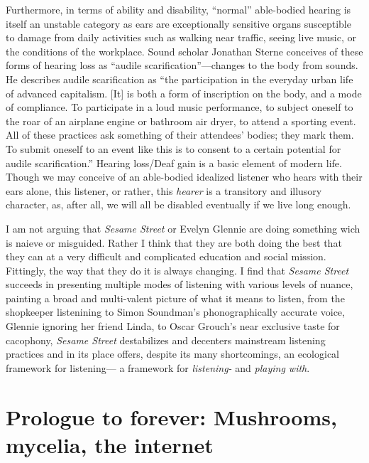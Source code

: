 \documentclass[12pt,letterpaper]{article}
\newcommand{\ses}{\textit{Sesame Street }}
\begin{document}
	Furthermore, in terms of ability and disability,
	``normal'' able-bodied hearing is itself an unstable category as ears 
	are exceptionally sensitive organs susceptible to damage from daily 
	activities such as walking near traffic, seeing live music, or the 
	conditions of the workplace.\autocite[208]{Holmes} Sound scholar 
	Jonathan Sterne conceives of these forms of hearing loss as ``audile 
	scarification''---changes to the body from sounds. He describes audile
	scarification as ``the participation in the everyday urban life of 
	advanced capitalism. [It] is both a form of inscription on the body, and
	a mode of compliance. To participate in a loud music performance, to 
	subject oneself to the roar of an airplane engine or bathroom air dryer,
	to attend a sporting event. All of these practices ask something of 
	their attendees’ bodies; they mark them. To submit oneself to an event 
	like this is to consent to a certain potential for audile 
	scarification.''\autocite[204]{Holmes} Hearing loss/Deaf gain is a 
	basic element of modern life. Though we may conceive of an able-bodied
	idealized listener who hears with their ears alone, this listener, or 
	rather, this \textit{hearer} is a transitory and illusory character,
	as, after all, we will all be disabled eventually if we live long 
	enough.

	I am not arguing that \textit{Sesame Street} or Evelyn Glennie are doing
	something wich is naieve or misguided. Rather I think that they are both
	doing the best that they can at a very difficult and complicated 
	education and social mission. Fittingly, the way that they do it is 
	always changing. I find that \ses 
	succeeds in presenting multiple modes of listening with various levels 
	of nuance, painting a broad and multi-valent picture of what it means 
	to listen, from the shopkeeper listenining to Simon Soundman's 
	phonographically accurate voice, Glennie ignoring her friend Linda, to
	Oscar Grouch's near exclusive taste for cacophony, \ses destabilizes 
	and decenters mainstream listening practices and in its place offers,
	despite its many shortcomings, an ecological framework for listening---
	a framework for \textit{listening-} and \textit{playing with}. 


	\newpage
	\section*{Prologue to forever: Mushrooms, mycelia, the internet}
	
\end{document}
